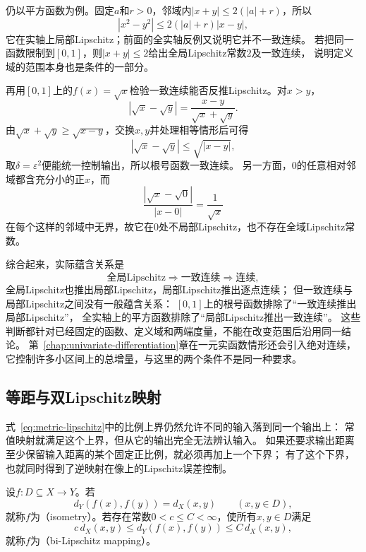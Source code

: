 仍以平方函数为例。固定$a$和$r>0$，邻域内$|x+y|\leq2(|a|+r)$，所以
\[
  |x^2-y^2|\leq 2(|a|+r)|x-y|,
\]
它在实轴上局部Lipschitz；前面的全实轴反例又说明它并不一致连续。
若把同一函数限制到$[0,1]$，则$|x+y|\leq2$给出全局Lipschitz常数$2$及一致连续，
说明定义域的范围本身也是条件的一部分。

再用$[0,1]$上的$f(x)=\sqrt x$检验一致连续能否反推Lipschitz。对$x>y$，
\[
  |\sqrt x-\sqrt y|=\frac{x-y}{\sqrt x+\sqrt y}.
\]
由$\sqrt x+\sqrt y\geq\sqrt{x-y}$，交换$x,y$并处理相等情形后可得
\[
  |\sqrt x-\sqrt y|\leq\sqrt{|x-y|},
\]
取$\delta=\varepsilon^2$便能统一控制输出，所以根号函数一致连续。
另一方面，$0$的任意相对邻域都含充分小的正$x$，而
\[
  \frac{|\sqrt x-\sqrt0|}{|x-0|}=\frac1{\sqrt x}
\]
在每个这样的邻域中无界，故它在$0$处不局部Lipschitz，也不存在全域Lipschitz常数。

综合起来，实际蕴含关系是
\[
  \text{全局Lipschitz}\Longrightarrow\text{一致连续}\Longrightarrow\text{连续},
\]
全局Lipschitz也推出局部Lipschitz，局部Lipschitz推出逐点连续；
但一致连续与局部Lipschitz之间没有一般蕴含关系：
$[0,1]$上的根号函数排除了“一致连续推出局部Lipschitz”，
全实轴上的平方函数排除了“局部Lipschitz推出一致连续”。
这些判断都针对已经固定的函数、定义域和两端度量，不能在改变范围后沿用同一结论。
第~\ref{chap:univariate-differentiation}章在一元实函数情形还会引入绝对连续，
它控制许多小区间上的总增量，与这里的两个条件不是同一种要求。

\subsection{等距与双Lipschitz映射}
\label{sec:metric-isometry-bilipschitz}

式~\eqref{eq:metric-lipschitz}中的比例上界仍然允许不同的输入落到同一个输出上：
常值映射就满足这个上界，但从它的输出完全无法辨认输入。
如果还要求输出距离至少保留输入距离的某个固定正比例，就必须再加上一个下界；
有了这个下界，也就同时得到了逆映射在像上的Lipschitz误差控制。

\begin{definition}[等距映射与双Lipschitz映射]
\label{def:metric-isometry-bilipschitz}
设$f:D\subseteq X\to Y$。若
\[
  d_Y(f(x),f(y))=d_X(x,y)\qquad(x,y\in D),
\]
就称$f$为（isometry）。若存在常数$0<c\leq C<\infty$，使所有$x,y\in D$满足
\begin{equation}
\label{eq:metric-bilipschitz}
  c\,d_X(x,y)\leq d_Y(f(x),f(y))\leq C\,d_X(x,y),
\end{equation}
就称$f$为（bi-Lipschitz mapping）。
\end{definition}

